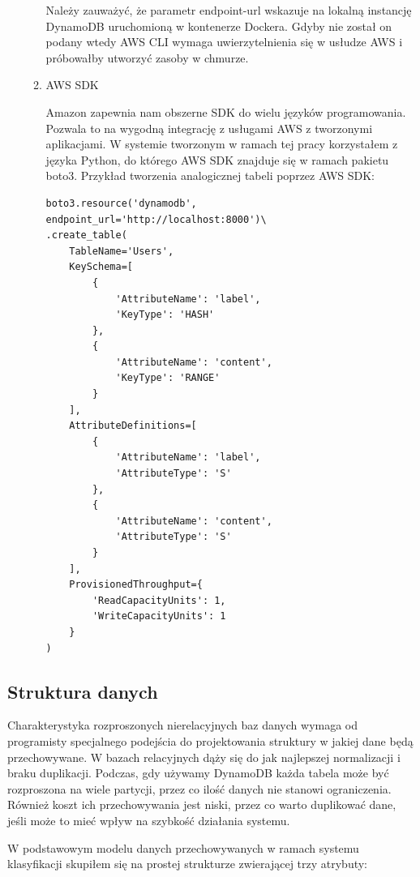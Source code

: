 \begin{enumerate}
\begin{enumerate}
        Należy zauważyć, że parametr endpoint-url wskazuje na lokalną instancję DynamoDB uruchomioną w kontenerze Dockera. Gdyby nie został on podany wtedy AWS CLI wymaga uwierzytelnienia się w usłudze AWS i próbowałby utworzyć zasoby w chmurze.
        
        \item AWS SDK
        
        Amazon zapewnia nam obszerne SDK do wielu języków programowania. Pozwala to na wygodną integrację z usługami AWS z tworzonymi aplikacjami. W systemie tworzonym w ramach tej pracy korzystałem z języka Python, do którego AWS SDK znajduje się w ramach pakietu boto3. Przykład tworzenia analogicznej tabeli poprzez AWS SDK:
        
        \begin{verbatim}
boto3.resource('dynamodb', endpoint_url='http://localhost:8000')\
.create_table(
    TableName='Users',
    KeySchema=[
        {
            'AttributeName': 'label',
            'KeyType': 'HASH'
        },
        {
            'AttributeName': 'content',
            'KeyType': 'RANGE'
        }
    ],
    AttributeDefinitions=[
        {
            'AttributeName': 'label',
            'AttributeType': 'S'
        },
        {
            'AttributeName': 'content',
            'AttributeType': 'S'
        }
    ],
    ProvisionedThroughput={
        'ReadCapacityUnits': 1,
        'WriteCapacityUnits': 1
    }
)
        \end{verbatim}
    \end{enumerate}
    
\end{enumerate}

\subsection{Struktura danych}

Charakterystyka rozproszonych nierelacyjnych baz danych wymaga od programisty specjalnego podejścia do projektowania struktury w jakiej dane będą przechowywane. W bazach relacyjnych dąży się do jak najlepszej normalizacji i braku duplikacji. Podczas, gdy używamy DynamoDB każda tabela może być rozproszona na wiele partycji, przez co ilość danych nie stanowi ograniczenia. Również koszt ich przechowywania jest niski, przez co warto duplikować dane, jeśli może to mieć wpływ na szybkość działania systemu.

W podstawowym modelu danych przechowywanych w ramach systemu klasyfikacji skupiłem się na prostej strukturze zwierającej trzy atrybuty:

